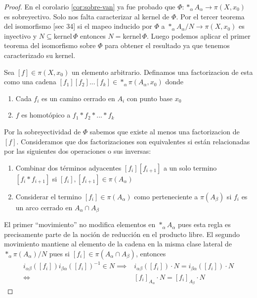 \begin{proof}
  En el corolario \ref{cor:sobre-van} ya fue probado que \(\Phi :
  *_\alpha A_\alpha \to \pi (X, x_0)\) es sobreyectivo. Solo nos falta
  caracterizar al kernel de \(\Phi\). Por el tercer teorema del
  isomorfismo \cite{Fraleigh}[sec 34]
  si el mapeo inducido por \(\Phi\) a \(*_\alpha A_\alpha / N \to \pi (X,
  x_0)\) es inyectivo y \(N \subseteq \text{kernel}\, \Phi\) entonces \(N =
  \text{kernel} \, \Phi\). Luego podemos aplicar el primer teorema del
  isomorfismo sobre \(\Phi\) para obtener el resultado ya que tenemos
  caracterizado su kernel.

  Sea \([f] \in \pi (X, x_0)\) un elemento arbitrario. Definamos una
  factorizacion de esta como una cadena \([f_1][f_2] ... [f_k] \in
  *_\alpha \pi (A_\alpha, x_0)\) donde
  \begin{enumerate}
  \item Cada \(f_i\) es un camino cerrado en \(A_i\) con punto base \(x_0\)
  \item \(f\) es homotópico a \(f_1 * f_2 * ... * f_k\)
  \end{enumerate}
  Por la sobreyectividad de \(\Phi\) sabemos que existe al menos una
  factorizacion de \([f]\).
  Consideramos que dos factorizaciones son equivalentes si están
  relacionadas por las siguientes dos operaciones o sus inversas:
  \begin{enumerate}
  \item Combinar dos términos adyacentes \([f_i][f_{i+1}]\) a un solo
    termino \([f_i * f_{i+1}]\) si \([f_i],[f_{i+1}] \in \pi
    (A_\alpha)\)
  \item Considerar el termino \([f_i] \in \pi (A_\alpha)\) como
    perteneciente a \(\pi (A_\beta)\) si \(f_i\) es un arco cerrado en
    \(A_\alpha \cap A_\beta\)
  \end{enumerate}
  El primer ``movimiento'' no modifica elementos en \(*_\alpha
  A_\alpha\) pues esta regla es precisamente parte de la noción
  de reducción en el producto libre. El segundo movimiento mantiene al
  elemento de la cadena en la misma clase lateral de \(*_\alpha \pi
  (A_\alpha) / N\) pues si \([f_i] \in \pi (A_\alpha \cap A_\beta)\),
  entonces
  \begin{align*}
    i_{\alpha \beta} \left( [f_i] \right) i_{\beta \alpha} \left( [f_i]
    \right)^{-1} \in N \implies
    &i_{\alpha \beta} \left( [f_i] \right) \cdot N = i_{\beta \alpha}
    \left( [f_i] \right) \cdot N \\
    \iff &[f_i]_{A_\alpha} \cdot N = [f_i]_{A_\beta} \cdot N

\end{align*}
\end{proof}
